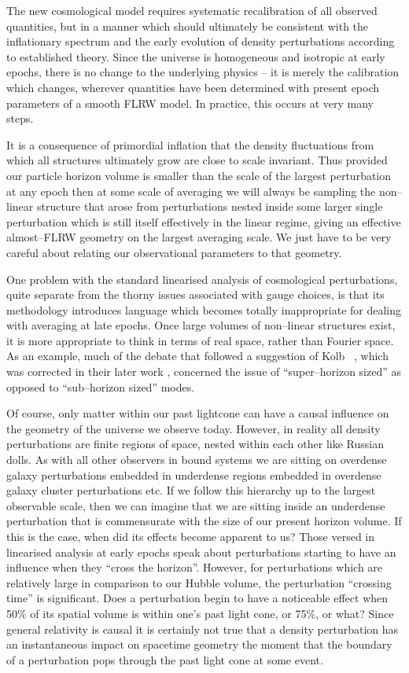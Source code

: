 \documentclass[12pt]{iopart}
\begin{document}
The new cosmological model requires systematic recalibration of all observed
quantities, but in a manner which should ultimately be consistent with the
inflationary spectrum and the early evolution of density perturbations
according to established theory. Since the universe is homogeneous
and isotropic at early epochs, there is no change to the underlying physics
-- it is merely the calibration which changes, wherever quantities have been
determined with present epoch parameters of a smooth FLRW model. In practice,
this occurs at very many steps.

It is a consequence of primordial inflation that the density fluctuations
from which all structures ultimately grow are close to scale invariant.
Thus provided our particle horizon volume is smaller than the scale of the
largest perturbation at any epoch then at some scale of averaging
we will always be sampling the non--linear structure that arose from
perturbations nested inside some larger single perturbation which is still
itself effectively in the linear regime, giving an effective almost--FLRW
geometry on the largest averaging scale. We just have to be very careful
about relating our observational parameters to that geometry.

One problem with the standard linearised analysis of cosmological
perturbations, quite separate from the thorny issues associated with
gauge choices, is that
its methodology introduces language which becomes totally inappropriate
for dealing with averaging at late epochs. Once large volumes of non--linear
structures exist, it is more appropriate to think in terms of real space,
rather than Fourier space. As an example, much of the debate that followed
a suggestion of Kolb \etal\ \cite{kolb1}, which was corrected in their
later work \cite{kolb2}, concerned the issue of ``super--horizon sized''
as opposed to ``sub--horizon sized'' modes.

Of course, only matter
within our past lightcone can have a causal influence on the geometry
of the universe we observe today. However, in reality all density
perturbations are finite regions of space, nested within each other
like Russian dolls.
As with all other observers in bound systems we are sitting on overdense
galaxy perturbations embedded in underdense regions embedded in overdense
galaxy cluster perturbations etc. If we follow this hierarchy up to the
largest observable scale, then we can imagine that we are sitting inside an
underdense perturbation that is commensurate with the size of our present
horizon volume. If this is the case, when did its effects become apparent to
us? Those versed in linearised analysis at early epochs speak about
perturbations starting to have an influence when they ``cross the
horizon''. However,
for perturbations which are relatively large in comparison to our Hubble
volume, the perturbation ``crossing time'' is significant. Does a
perturbation begin to have a noticeable effect when 50\% of its spatial
volume is within one's past light cone, or 75\%, or what? Since general
relativity is causal it is certainly not true that a density perturbation
has an instantaneous impact on spacetime geometry the moment that
the boundary of a perturbation pops through the past light cone at some event.
\end{document}

